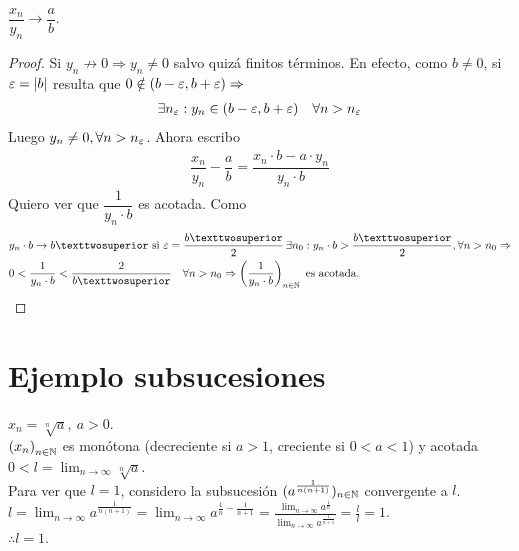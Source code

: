 \begin{prop}
  \(\dfrac{x_n}{y_n} \to \dfrac{a}{b} \).
  \begin{proof}
    Si \(y_n \not \to 0 \Rightarrow y_n \neq 0\) salvo quizá finitos términos. En efecto, como \(b \neq 0\), si \(\varepsilon = |b|\) resulta que \(0 \notin (b - \varepsilon, b + \varepsilon) \Rightarrow \)
    \begin{align*}
      \exists n_{\varepsilon} : y_n \in (b-\varepsilon, b+\varepsilon) \quad \forall n > n_{\varepsilon}
    \end{align*} Luego \(y_n \neq 0, \forall n > n_{\varepsilon} \). Ahora escribo \begin{align*}
      \dfrac{x_n}{y_n} - \dfrac{a}{b} = \dfrac{x_n \cdot b - a \cdot y_n}{y_n \cdot b}
    \end{align*} Quiero ver que \(\dfrac{1}{y_n \cdot b} \) es acotada. Como
    \begin{align*}
       & y_n \cdot b \to b² \text{ si } \e = \dfrac{b²}{2} \, \exists n_0 : y_n \cdot b > \dfrac{b²}{2}, \forall n > n_0 \Rightarrow                     \\
       & 0 < \dfrac{1}{y_n \cdot b} < \dfrac{2}{b²} \quad \forall n > n_0 \Rightarrow \left(\dfrac{1}{y_n \cdot b}\right)_{n \in \N} \text{ es acotada}.
    \end{align*}
  \end{proof}
\end{prop}

\section{Ejemplo subsucesiones}

\begin{eg}
  \(x_n = \sqrt[n]{a}, \ a > 0\). \\
  \({(x_n)}_{n \in \mathbb{N}} \) es monótona (decreciente si \(a > 1\), creciente si \(0 < a < 1\)) y acotada \(0 < l = \lim_{n \to \infty} \sqrt[n]{a} \). \\
  Para ver que \(l = 1\), considero la subsucesión \((a^{\frac{1}{n(n+1)}})_{n \in \mathbb{N}} \) convergente a \(l\). \\
  \(l = \lim_{n \to \infty} a^{\frac{1}{n(n+1)}} = \lim_{n \to \infty} a^{\frac{1}{n} - \frac{1}{n+1}} =
  \frac{\lim_{n \to \infty} a^{\frac{1}{n}}}{\lim_{n \to \infty} a^{\frac{1}{n+1}}} = \frac{l}{l} = 1.\) \\
  \(\therefore l = 1\).
\end{eg}

